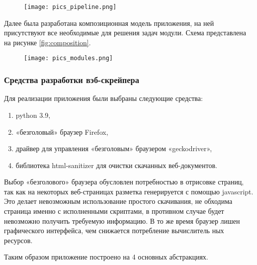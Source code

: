 \documentclass[../main]{subfiles}
\begin{document}
\begin{figure}[H]
    \centering
    {\texttt{[image: pics\_pipeline.png]}}
    \vspace{-\baselineskip}
\end{figure}

Далее была разработана композиционная модель приложения, на ней присутствуют все необходимые для решения задач модули. Схема представлена на рисунке \ref{fig:composition}.

\begin{figure}[H]
    \centering
    {\texttt{[image: pics\_modules.png]}}
    \vspace{-\baselineskip}
\end{figure}

\subsubsection{Средства разработки вэб-скрейпера}
Для реализации приложения были выбраны следующие средства:
\begin{enumerate}
    \item python 3.9,
    \item «безголовый» браузер Firefox,
    \item драйвер для управления «безголовым» браузером «geckodriver»,
    \item библиотека html-sanitizer для очистки скачанных веб-документов. 
\end{enumerate}

Выбор «безголового» браузера обусловлен потребностью в отрисовке страниц, так как на некоторых веб-страницах разметка генерируется с помощью javascript. Это делает невозможным использование простого скачивания, не обходима страница именно с исполненными скриптами, в противном случае будет невозможно получить требуемую информацию. В то же время браузер лишен графического интерфейса, чем снижается потребление вычислитель ных ресурсов. 

Таким образом приложение построено на 4 основных абстракциях.
\end{document}
